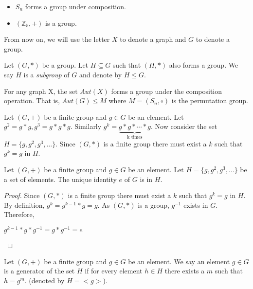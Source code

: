 \begin{example}
\begin{itemize}
\item $S_n$ forms a group under composition.
\item $(\mathbb{Z}_5,+)$ is a group.
\end{itemize}
\end{example}

From now on, we will use the letter $X$ to denote a graph and $G$ to denote a group.

\begin{remark} 
Let $(G,*)$ be a group. Let $H\subseteq G$ such that $(H,*)$ also forms a group. We say $H$ is a {\em subgroup} of $G$ and denote by $H\leq G$.   
\end{remark}


\begin{exercise}
For any graph X, the set $Aut(X)$ forms a group under the composition operation. That is, $Aut(G)\leq M$ where $M=(S_n,\circ)$ is the permutation group.
\end{exercise}

Let $(G,+)$ be a finite group and $g\in G$ be an element. Let $g^2 =  g*g ,g^3 =  g*g*g $. Similarly $g^k = \underbrace{g*g*\cdots * g}_\text{k times}$. Now consider the set $H=  \{g,g^2,g^3,\ldots\}$. Since $(G,*)$ is a finite group there must exist a $k$ such that $g^k=g$ in $H$.

\begin{lemma}
Let $(G,+)$ be a finite group and $g\in G$ be an element. Let $H=\{g,g^2,g^3,\ldots\}$ be a set of elements. The unique identity $e$ of $G$ is in $H$.
\end{lemma}
\begin{proof}
Since $(G,*)$ is a finite group there must exist a $k$ such that $g^k=g$ in $H$. By definition, $g^k = g^{k-1}*g = g$. As $(G,*)$ is a group, $g^{-1}$ exists in $G$.\\
Therefore,
\begin{center}
$g^{k-1}*g*g^{-1} = g*g^{-1} = e$ 
\end{center}
\end{proof}

\begin{definition}[Generator]
Let $(G,+)$ be a finite group and $g\in G$ be an element. We say an element $g\in G$ is a generator of the set $H$ if for every element $h\in H$ there exists a $m$ such that $h=g^m$.  (denoted by $H=<g>$).
\end{definition}


